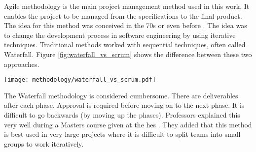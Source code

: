 Agile methodology is the main project management method used in this work. It enables the project to be managed from the specifications to the final product. The idea for this method was conceived in the 70s or even before \cite{abbas_historical_2008}.  The idea was to change the development process in software engineering by using iterative techniques. Traditional methods worked with sequential techniques, often called Waterfall. Figure \ref{fig:waterfall_vs_scrum} shows the difference between these two approaches.
\begin{center}
    \begingroup
    \texttt{[image: methodology/waterfall\_vs\_scrum.pdf]}
    \label{fig:waterfall_vs_scrum}
    \endgroup
\end{center}
The Waterfall methodology is considered cumbersome. There are deliverables after each phase. Approval is required before moving on to the next phase. It is difficult to go backwards (by moving up the phases). Professors explained this very well during a Masters course given at the \gls{hes} \cite{course_MA_ITProMan}. They added that this method is best used in very large projects where it is difficult to split teams into small groups to work iteratively.

